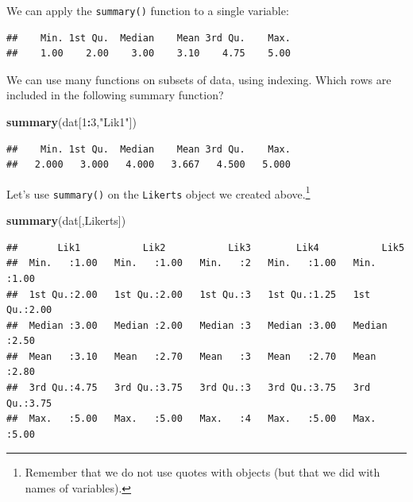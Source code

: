 \documentclass[
]{book}
\newenvironment{Shaded}{\begin{snugshade}}{\end{snugshade}}
\newcommand{\DecValTok}[1]{\textcolor[rgb]{0.00,0.00,0.81}{#1}}
\newcommand{\KeywordTok}[1]{\textcolor[rgb]{0.13,0.29,0.53}{\textbf{#1}}}
\newcommand{\NormalTok}[1]{#1}
\newcommand{\OperatorTok}[1]{\textcolor[rgb]{0.81,0.36,0.00}{\textbf{#1}}}
\newcommand{\StringTok}[1]{\textcolor[rgb]{0.31,0.60,0.02}{#1}}
\begin{document}
We can apply the \texttt{summary()} function to a single variable:

\begin{Shaded}
\end{Shaded}

\begin{verbatim}
##    Min. 1st Qu.  Median    Mean 3rd Qu.    Max. 
##    1.00    2.00    3.00    3.10    4.75    5.00
\end{verbatim}

We can use many functions on subsets of data, using indexing. Which rows are included in the following summary function?

\begin{Shaded}
\begin{Highlighting}[]
\KeywordTok{summary}\NormalTok{(dat[}\DecValTok{1}\OperatorTok{:}\DecValTok{3}\NormalTok{,}\StringTok{"Lik1"}\NormalTok{])}
\end{Highlighting}
\end{Shaded}

\begin{verbatim}
##    Min. 1st Qu.  Median    Mean 3rd Qu.    Max. 
##   2.000   3.000   4.000   3.667   4.500   5.000
\end{verbatim}

Let's use \texttt{summary()} on the \texttt{Likerts} object we created above.\footnote{Remember that we do not use quotes with objects (but that we did with names of variables).}

\begin{Shaded}
\begin{Highlighting}[]
\KeywordTok{summary}\NormalTok{(dat[,Likerts])}
\end{Highlighting}
\end{Shaded}

\begin{verbatim}
##       Lik1           Lik2           Lik3        Lik4           Lik5     
##  Min.   :1.00   Min.   :1.00   Min.   :2   Min.   :1.00   Min.   :1.00  
##  1st Qu.:2.00   1st Qu.:2.00   1st Qu.:3   1st Qu.:1.25   1st Qu.:2.00  
##  Median :3.00   Median :2.00   Median :3   Median :3.00   Median :2.50  
##  Mean   :3.10   Mean   :2.70   Mean   :3   Mean   :2.70   Mean   :2.80  
##  3rd Qu.:4.75   3rd Qu.:3.75   3rd Qu.:3   3rd Qu.:3.75   3rd Qu.:3.75  
##  Max.   :5.00   Max.   :5.00   Max.   :4   Max.   :5.00   Max.   :5.00
\end{verbatim}
\end{document}
